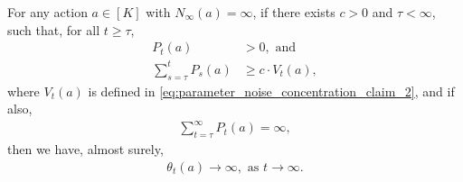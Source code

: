 \begin{lemma}
\label{lem:positive_unbounded_progress_unbounded_parameter}
For any action $a \in [K]$ with $N_\infty(a) = \infty$, if there exists $c > 0$ and $\tau < \infty$, such that, for all $t \ge \tau$,
\begin{align}
\label{eq:positive_unbounded_progress_unbounded_parameter_claim_1a}
    P_t(a) &> 0, \text{ and} \\
\label{eq:positive_unbounded_progress_unbounded_parameter_claim_1b}
    \sum_{s=\tau}^{t} P_s(a) &\ge c \cdot V_t(a),
\end{align}
where $V_t(a)$ is defined in \cref{eq:parameter_noise_concentration_claim_2}, and if also,
\begin{align}
\label{eq:positive_unbounded_progress_unbounded_parameter_claim_2}
    \sum_{t=\tau}^{\infty}{ P_t(a) } = \infty,
\end{align}
then we have, almost surely,
\begin{align}
\label{eq:positive_unbounded_progress_unbounded_parameter_claim_3}
    \theta_t(a) \to \infty, \text{ as } t \to \infty.
\end{align}
\end{lemma}
